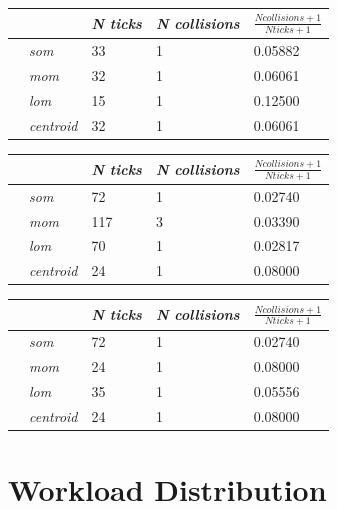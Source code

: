 \documentclass[conference]{IEEEtran}
\begin{document}
\begin{center}
\begin{tabular}{ | m{2.8em} | m{3em} | m{2.8em} | m{5em} | m{5.2em} | }
\hline
{} & \textit{N ticks} & \textit{N collisions} & $\frac{N collisions + 1}{N ticks + 1}$ \\
\hline
{} & \textit{som} & 33 & 1 & 0.05882 \\
 & \textit{mom} & 32 & 1 & 0.06061 \\
 & \textit{lom} & 15 & 1 & 0.12500 \\
 & \textit{centroid} & 32 & 1 & 0.06061 \\
\hline
\end{tabular}
\label{table:ps10e1asum}
\end{center}


\begin{center}
\begin{tabular}{ | m{2.8em} | m{3em} | m{2.8em} | m{5em} | m{5.2em} | }
\hline
{} & \textit{N ticks} & \textit{N collisions} & $\frac{N collisions + 1}{N ticks + 1}$ \\
\hline
{} & \textit{som} & 72 & 1 & 0.02740 \\
 & \textit{mom} & 117 & 3 & 0.03390 \\
 & \textit{lom} & 70 & 1 & 0.02817 \\
 & \textit{centroid} & 24 & 1 & 0.08000 \\
\hline
\end{tabular}
\label{table:ps10e2amax}
\end{center}

\begin{center}
\begin{tabular}{ | m{2.8em} | m{3em} | m{2.8em} | m{5em} | m{5.2em} | }
\hline
{} & \textit{N ticks} & \textit{N collisions} & $\frac{N collisions + 1}{N ticks + 1}$ \\
\hline
{} & \textit{som} & 72 & 1 & 0.02740 \\
 & \textit{mom} & 24 & 1 & 0.08000 \\
 & \textit{lom} & 35 & 1 & 0.05556 \\
 & \textit{centroid} & 24 & 1 & 0.08000 \\
\hline
\end{tabular}
\label{table:ps10e2asum}
\end{center}


\newpage

\section{Workload Distribution}



\end{document}
